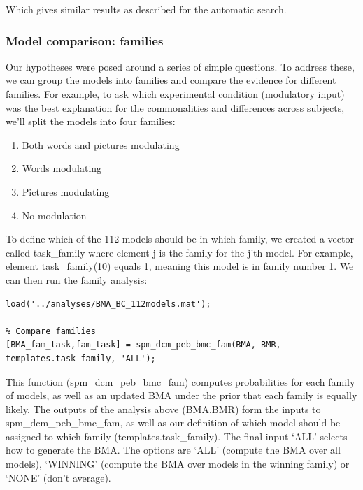 \documentclass{article}
\begin{document}
Which gives similar results as described for the automatic search.

\subsubsection{Model comparison: families}
Our hypotheses were posed around a series of simple questions. To address these, we can group the models into families and compare the evidence for different families. For example, to ask which experimental condition (modulatory input) was the best explanation for the commonalities and differences across subjects, we'll split the models into four families:

\begin{enumerate}
    \item Both words and pictures modulating
    \item Words modulating
    \item Pictures modulating
    \item No modulation
\end{enumerate}

To define which of the 112 models should be in which family, we created a vector called task\_family where element j is the family for the j'th model. For example, element task\_family(10) equals 1, meaning this model is in family number 1. We can then run the family analysis:

\begin{lstlisting}[style=Matlab-editor,caption=Family comparison]
% Load the result from the comparison of 112 reduced models
load('../analyses/BMA_BC_112models.mat');

% Compare families
[BMA_fam_task,fam_task] = spm_dcm_peb_bmc_fam(BMA, BMR, templates.task_family, 'ALL');
\end{lstlisting}

This function (spm\_dcm\_peb\_bmc\_fam) computes probabilities for each family of models, as well as an updated BMA under the prior that each family is equally likely. The outputs of the analysis above (BMA,BMR) form the inputs to spm\_dcm\_peb\_bmc\_fam, as well as our definition of which model should be assigned to which family (templates.task\_family). The final input `ALL' selects how to generate the BMA. The options are `ALL' (compute the BMA over all models), `WINNING' (compute the BMA over models in the winning family) or `NONE' (don't average). 
\end{document}
